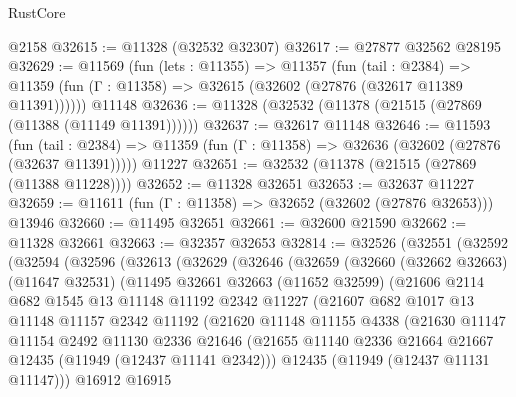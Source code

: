 \begin{lexlean}{RustCore}
\begin{coremodule}
    @2158
@32615 := @11328 (@32532 @32307)
@32617 := @27877 @32562 @28195
@32629 := @11569
    (fun (lets : @11355) =>
    @11357
      (fun (tail : @2384) =>
      @11359 (fun (Γ : @11358) => @32615 (@32602 (@27876 (@32617 @11389 @11391))))))
    @11148
@32636 := @11328 (@32532 (@11378 (@21515 (@27869 (@11388 (@11149 @11391))))))
@32637 := @32617 @11148
@32646 := @11593
    (fun (tail : @2384) => @11359 (fun (Γ : @11358) => @32636 (@32602 (@27876 (@32637 @11391)))))
    @11227
@32651 := @32532 (@11378 (@21515 (@27869 (@11388 @11228))))
@32652 := @11328 @32651
@32653 := @32637 @11227
@32659 := @11611 (fun (Γ : @11358) => @32652 (@32602 (@27876 @32653))) @13946
@32660 := @11495 @32651
@32661 := @32600 @21590
@32662 := @11328 @32661
@32663 := @32357 @32653
@32814 := @32526
    (@32551
      (@32592
        (@32594
          (@32596
            (@32613
              (@32629
                (@32646
                  (@32659
                    (@32660
                      (@32662 @32663)
                      (@11647 @32531)
                      (@11495
                        @32661
                        @32663
                        (@11652 @32599)
                        (@21606
                          @2114
                          @682
                          @1545
                          @13
                          @11148
                          @11192
                          @2342
                          @11227
                          (@21607
                            @682
                            @1017
                            @13
                            @11148
                            @11157
                            @2342
                            @11192
                            (@21620
                              @11148
                              @11155
                              @4338
                              (@21630
                                @11147
                                @11154
                                @2492
                                @11130
                                @2336
                                @21646
                                (@21655
                                  @11140
                                  @2336
                                  @21664
                                  @21667
                                  @12435
                                  (@11949 (@12437 @11141 @2342)))
                                @12435
                                (@11949 (@12437 @11131 @11147)))
                              @16912
                              @16915

\end{coremodule}
\end{lexlean}
